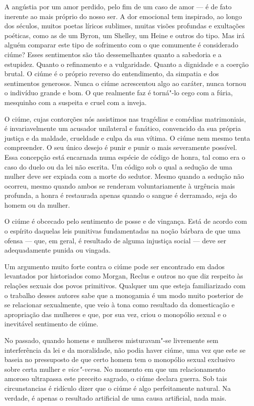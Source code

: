 A angústia por um amor perdido, pelo fim de um caso de amor --- é de fato
inerente ao mais próprio do nosso ser. A dor emocional tem inspirado, ao
longo dos séculos, muitos poetas líricos sublimes, muitas visões
profundas e exultações poéticas, como as de um Byron, um Shelley, um
Heine e outros do tipo. Mas irá alguém comparar este tipo de sofrimento
com o que comumente é considerado ciúme? Esses sentimentos são tão
dessemelhantes quanto a sabedoria e a estupidez. Quanto o refinamento e
a vulgaridade. Quanto a dignidade e a coerção brutal. O ciúme é o
próprio reverso do entendimento, da simpatia e dos sentimentos
generosos. Nunca o ciúme acrescentou algo ao caráter, nunca tornou o
indivíduo grande e bom. O que realmente faz é torná"-lo cego com a fúria,
mesquinho com a suspeita e cruel com a inveja.

O ciúme, cujas contorções nós assistimos nas tragédias e comédias
matrimoniais, é invariavelmente um acusador unilateral e fanático,
convencido da sua própria justiça e da maldade, crueldade e culpa da sua
vítima. O ciúme nem mesmo tenta compreender. O seu único desejo é punir
e punir o mais severamente possível. Essa concepção está encarnada numa espécie de
código de honra, tal como era o caso do duelo ou da lei não escrita. Um
código sob o qual a sedução de uma mulher deve ser expiada com a morte
do sedutor. Mesmo quando a sedução não ocorreu, mesmo quando ambos se
renderam voluntariamente à urgência mais profunda, a honra é restaurada
apenas quando o sangue é derramado, seja do homem ou da mulher.

O ciúme é obcecado pelo sentimento de posse e de vingança. Está de
acordo com o espírito daquelas leis punitivas fundamentadas na noção
bárbara de que uma ofensa --- que, em geral, é resultado de alguma
injustiça social --- deve ser adequadamente punida ou vingada.

Um argumento muito forte contra o ciúme pode ser encontrado em dados
levantados por historiados como Morgan, Reclus e outros no que diz
respeito às relações sexuais dos povos primitivos. Qualquer um que
esteja familiarizado com o trabalho desses autores sabe que a monogamia
é um modo muito posterior de se relacionar sexualmente, que veio à tona
como resultado da domesticação e apropriação das mulheres e que, por sua
vez, criou o monopólio sexual e o inevitável sentimento de ciúme.

No passado, quando homens e mulheres misturavam"-se livremente sem
interferência da lei e da moralidade, não podia haver ciúme, uma vez que
este se baseia no pressuposto de que certo homem tem o monopólio sexual
exclusivo sobre certa mulher e \textit{vice"-versa.} No momento em que um
relacionamento amoroso ultrapassa este preceito sagrado, o ciúme declara
guerra. Sob tais circunstancias é ridículo dizer que o ciúme é algo
perfeitamente natural. Na verdade, é apenas o resultado artificial de
uma causa artificial, nada mais.

